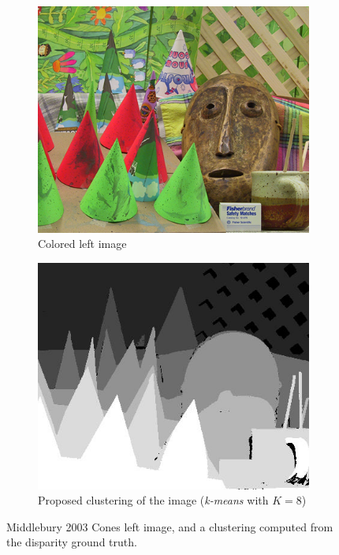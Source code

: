 \begin{figure}
    \centering
    \begin{subfigure}[t]{0.5\linewidth}
        \centering
        \includegraphics[width=0.9\linewidth]{Images/Chap_4/im2.png}
        \caption{Colored left image}
        \label{fig:color_cones_image}
    \end{subfigure}\hfill
    \begin{subfigure}[t]{0.5\linewidth}
        \centering
        \includegraphics[width=0.9\linewidth]{Images/Chap_4/cluster.jpg}
        \caption{Proposed clustering of the image (\textit{k-means} with $K=8$)}
        \label{fig:cluster}
    \end{subfigure}
    \caption{Middlebury 2003 Cones left image, and a clustering computed from the disparity ground truth.}
    \label{fig:clustering_example}
\end{figure}

